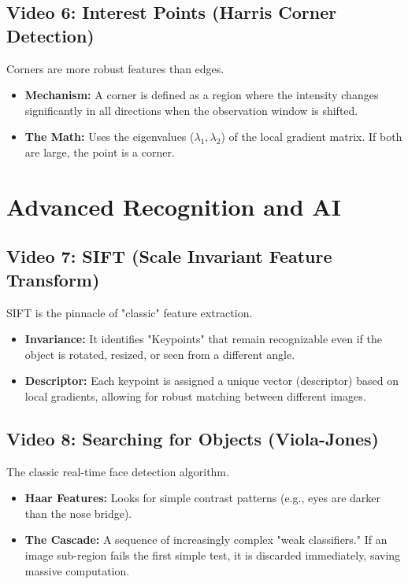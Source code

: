 \documentclass[11pt]{article}
\begin{document}
\subsection{Video 6: Interest Points (Harris Corner Detection)}
Corners are more robust features than edges.
\begin{itemize}
    \item \textbf{Mechanism:} A corner is defined as a region where the intensity changes significantly in all directions when the observation window is shifted.
    \item \textbf{The Math:} Uses the eigenvalues ($\lambda_1, \lambda_2$) of the local gradient matrix. If both are large, the point is a corner.
\end{itemize}

\section{Advanced Recognition and AI}

\subsection{Video 7: SIFT (Scale Invariant Feature Transform)}
SIFT is the pinnacle of "classic" feature extraction.
\begin{itemize}
    \item \textbf{Invariance:} It identifies "Keypoints" that remain recognizable even if the object is rotated, resized, or seen from a different angle.
    \item \textbf{Descriptor:} Each keypoint is assigned a unique vector (descriptor) based on local gradients, allowing for robust matching between different images.
\end{itemize}

\subsection{Video 8: Searching for Objects (Viola-Jones)}
The classic real-time face detection algorithm.
\begin{itemize}
    \item \textbf{Haar Features:} Looks for simple contrast patterns (e.g., eyes are darker than the nose bridge).
    \item \textbf{The Cascade:} A sequence of increasingly complex "weak classifiers." If an image sub-region fails the first simple test, it is discarded immediately, saving massive computation.
\end{itemize}
\end{document}
